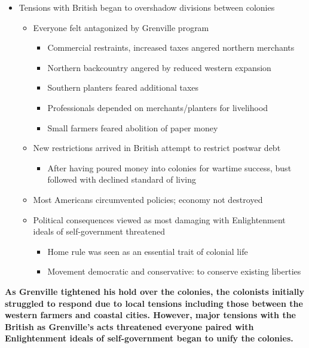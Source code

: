 \documentclass[a4paper]{article}
\begin{document}
{\begin{itemize}
\begin{itemize}
\begin{itemize}
\begin{itemize}
                \end{itemize}
            \end{itemize}
        \end{itemize}
        \item Tensions with British began to overshadow divisions between colonies
        \begin{itemize}
            \item Everyone felt antagonized by Grenville program
            \begin{itemize}
                \item Commercial restraints, increased taxes angered northern merchants
                \item Northern backcountry angered by reduced western expansion
                \item Southern planters feared additional taxes
                \item Professionals depended on merchants/planters for livelihood
                \item Small farmers feared abolition of paper money
            \end{itemize}
            \item New restrictions arrived in British attempt to restrict postwar debt
            \begin{itemize}
                \item After having poured money into colonies for wartime success, bust followed with declined standard of living
            \end{itemize}
            \item Most Americans circumvented policies; economy not destroyed
            \item Political consequences viewed as most damaging with Enlightenment ideals of self-government threatened
            \begin{itemize}
                \item Home rule was seen as an essential trait of colonial life
                \item Movement democratic and conservative: to conserve existing liberties
            \end{itemize}
        \end{itemize}
    \end{itemize}
    \textbf{As Grenville tightened his hold over the colonies, the colonists initially struggled to respond due to local tensions including those between the western farmers and coastal cities. However, major tensions with the British as Grenville's acts threatened everyone paired with Enlightenment ideals of self-government began to unify the colonies.}}
    
\end{document}
